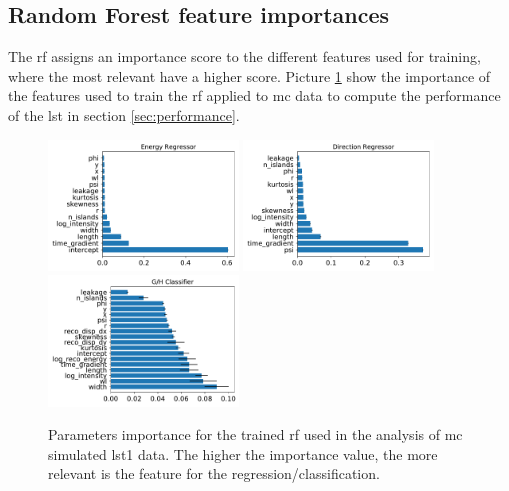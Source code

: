 \documentclass[main.tex]{subfiles}
\begin{document}
\subsection{Random Forest feature importances}

The \gls{rf} assigns an importance score to the different features used for training, where the most relevant have a higher score. Picture \ref{fig:importances} show the importance of the features used to train the \gls{rf} applied to \gls{mc} data to compute the performance of the \gls{lst} in section \ref{sec:performance}.

\begin{figure}[h]
  \centering
  \includegraphics[width=0.45\textwidth]{Pictures/reg_energy_importances.pdf}
  \includegraphics[width=0.45\textwidth]{Pictures/reg_disp_vector_importances.pdf}
  \includegraphics[width=0.45\textwidth]{Pictures/gls_importances.pdf}
  \caption{Parameters importance for the trained \gls{rf} used in the analysis of \gls{mc} simulated \gls{lst}1 data. The higher the importance value, the more relevant is the feature for the regression/classification.}
  \label{fig:importances}
\end{figure}
\end{document}
